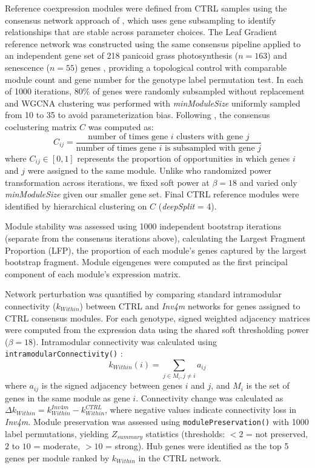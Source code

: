 \documentclass[9pt,twocolumn,twoside]{rilabRxiv}
\newcommand{\invfour}{\textit{Inv4m}\xspace}
\begin{document}
Reference coexpression modules were defined from CTRL samples using the consensus network approach of \cite{shahan2018}, which uses gene subsampling to identify relationships that are stable across parameter choices.
The Leaf Gradient reference network was constructed using the same consensus pipeline applied to an independent gene set of 218 panicoid grass photosynthesis ($n = 163$) and senescence ($n = 55$) genes \cite{ojedarivera2026}, providing a topological control with comparable module count and gene number for the genotype label permutation test.
In each of 1000 iterations, 80\% of genes were randomly subsampled without replacement and WGCNA clustering was performed with \textit{minModuleSize} uniformly sampled from 10 to 35 to avoid parameterization bias.
Following \cite{shahan2018}, the consensus coclustering matrix $C$ was computed as:
\begin{equation}
C_{ij} = \frac{\text{number of times gene } i \text{ clusters with gene } j}{\text{number of times gene } i \text{ is subsampled with gene } j}
\end{equation}
where $C_{ij} \in [0,1]$ represents the proportion of opportunities in which genes $i$ and $j$ were assigned to the same module.
Unlike \cite{shahan2018} who randomized power transformation across iterations, we fixed soft power at $\beta = 18$ and varied only \textit{minModuleSize} given our smaller gene set.
Final CTRL reference modules were identified by hierarchical clustering on $C$ (\textit{deepSplit} = 4).

Module stability was assessed using 1000 independent bootstrap iterations (separate from the consensus iterations above), calculating the Largest Fragment Proportion (LFP), the proportion of each module's genes captured by the largest bootstrap fragment.
Module eigengenes were computed as the first principal component of each module's expression matrix.

Network perturbation was quantified by comparing standard intramodular connectivity ($k_{Within}$) between CTRL and \invfour networks for genes assigned to CTRL consensus modules.
For each genotype, signed weighted adjacency matrices were computed from the expression data using the shared soft thresholding power ($\beta = 18$).
Intramodular connectivity was calculated using \texttt{intramodularConnectivity()} \cite{langfelder2008}:
\begin{equation}
k_{Within}(i) = \sum_{j \in M_i, j \neq i} a_{ij}
\end{equation}
where $a_{ij}$ is the signed adjacency between genes $i$ and $j$, and $M_i$ is the set of genes in the same module as gene $i$.
Connectivity change was calculated as $\Delta k_{Within} = k_{Within}^{Inv4m} - k_{Within}^{CTRL}$, where negative values indicate connectivity loss in \invfour.
Module preservation was assessed using \texttt{modulePreservation()} \cite{langfelder2011} with 1000 label permutations, yielding $Z_{summary}$ statistics (thresholds: $< 2$ = not preserved, $2$ to $10$ = moderate, $> 10$ = strong).
Hub genes were identified as the top 5 genes per module ranked by $k_{Within}$ in the CTRL network.
\end{document}
